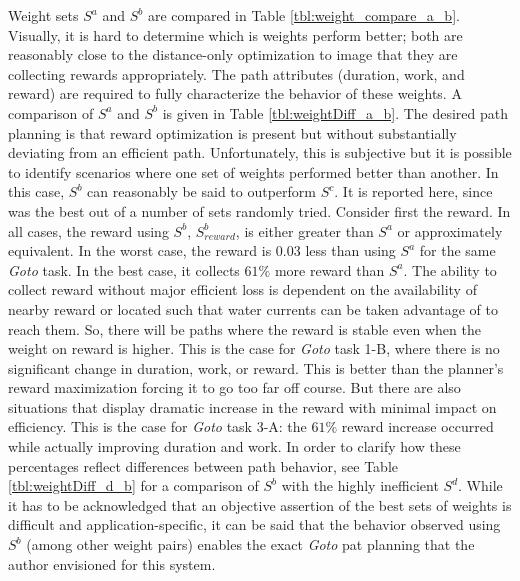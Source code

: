 \documentclass{tamuccthesis}
\begin{document}
Weight sets $S^a$ and $S^b$ are compared in Table \ref{tbl:weight_compare_a_b}. Visually, it is hard to determine which is weights perform better; both are reasonably close to the distance-only optimization to image that they are collecting rewards appropriately. The path attributes (duration, work, and reward) are required to fully characterize the behavior of these weights. A comparison of $S^a$ and $S^b$ is given in Table \ref{tbl:weightDiff_a_b}. The desired path planning is that reward optimization is present but without substantially deviating from an efficient path. Unfortunately, this is subjective but it is possible to identify scenarios where one set of weights performed better than another. In this case, $S^b$ can reasonably be said to outperform $S^c$. It is reported here, since was the best out of a number of sets randomly tried. Consider first the reward. In all cases, the reward using $S^b$, $S^b_{reward}$, is either greater than $S^a$ or approximately equivalent. In the worst case, the reward is 0.03 less than using $S^a$ for the same \textit{Goto} task. In the best case, it collects $61\%$ more reward than $S^a$. The ability to collect reward without major efficient loss is dependent on the availability of nearby reward or located such that water currents can be taken advantage of to reach them. So, there will be paths where the reward is stable even when the weight on reward is higher. This is the case for \textit{Goto} task 1-B, where there is no significant change in duration, work, or reward. This is better than the planner's reward maximization forcing it to go too far off course. But there are also situations that display dramatic increase in the reward with minimal impact on efficiency. This is the case for \textit{Goto} task 3-A: the $61\%$ reward increase occurred while actually improving duration and work. In order to clarify how these percentages reflect differences between path behavior, see Table \ref{tbl:weightDiff_d_b} for a comparison of $S^b$ with the highly inefficient $S^d$. While it has to be acknowledged that an objective assertion of the best sets of weights is difficult and application-specific, it can be said that the behavior observed using $S^b$ (among other weight pairs) enables the exact \textit{Goto} pat planning that the author envisioned for this system. 
\end{document}
